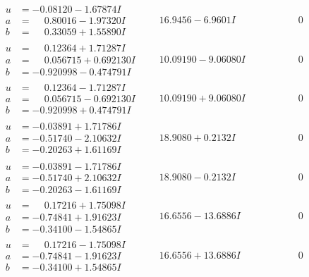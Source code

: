 \documentclass[1p]{elsarticle_modified}
\theoremstyle{definition}
\begin{document}
$$\begin{array}{c|c|c}
\begin{aligned}
u &= -0.08120 - 1.67874 I \\
a &= \phantom{-}0.80016 - 1.97320 I \\
b &= \phantom{-}0.33059 + 1.55890 I\end{aligned}
 & \phantom{-}16.9456 - 6.9601 I & \phantom{-0.000000 } 0 \\ \hline\begin{aligned}
u &= \phantom{-}0.12364 + 1.71287 I \\
a &= \phantom{-}0.056715 + 0.692130 I \\
b &= -0.920998 - 0.474791 I\end{aligned}
 & \phantom{-}10.09190 - 9.06080 I & \phantom{-0.000000 } 0 \\ \hline\begin{aligned}
u &= \phantom{-}0.12364 - 1.71287 I \\
a &= \phantom{-}0.056715 - 0.692130 I \\
b &= -0.920998 + 0.474791 I\end{aligned}
 & \phantom{-}10.09190 + 9.06080 I & \phantom{-0.000000 } 0 \\ \hline\begin{aligned}
u &= -0.03891 + 1.71786 I \\
a &= -0.51740 - 2.10632 I \\
b &= -0.20263 + 1.61169 I\end{aligned}
 & \phantom{-}18.9080 + 0.2132 I & \phantom{-0.000000 } 0 \\ \hline\begin{aligned}
u &= -0.03891 - 1.71786 I \\
a &= -0.51740 + 2.10632 I \\
b &= -0.20263 - 1.61169 I\end{aligned}
 & \phantom{-}18.9080 - 0.2132 I & \phantom{-0.000000 } 0 \\ \hline\begin{aligned}
u &= \phantom{-}0.17216 + 1.75098 I \\
a &= -0.74841 + 1.91623 I \\
b &= -0.34100 - 1.54865 I\end{aligned}
 & \phantom{-}16.6556 - 13.6886 I & \phantom{-0.000000 } 0 \\ \hline\begin{aligned}
u &= \phantom{-}0.17216 - 1.75098 I \\
a &= -0.74841 - 1.91623 I \\
b &= -0.34100 + 1.54865 I\end{aligned}
 & \phantom{-}16.6556 + 13.6886 I & \phantom{-0.000000 } 0 \\ \hline\begin{aligned}

\end{aligned}
\end{array}$$
\end{document}
